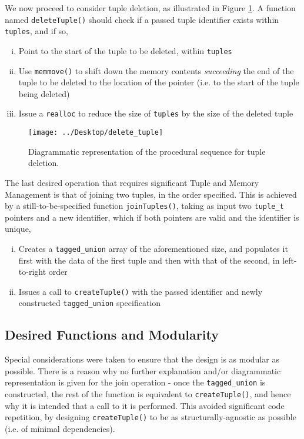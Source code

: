 \documentclass[10pt, a4paper, oneside]{memoir}
\begin{document}
	We now proceed to consider tuple deletion, as illustrated in Figure \ref{fig:deletetuple}. A function named \texttt{deleteTuple()} should check if a passed tuple identifier exists within \texttt{tuples}, and if so,
	\begin{enumerate}[i.]
		\item Point to the start of the tuple to be deleted, within \texttt{tuples}
		\item Use \texttt{memmove()} to shift down the memory contents \textit{succeeding} the end of the tuple to be deleted to the location of the pointer (i.e. to the start of the tuple being deleted)
		\item Issue a \texttt{realloc} to reduce the size of \texttt{tuples} by the size of the deleted tuple
	\end{enumerate}

	\begin{figure}[h]
		\centering
		\texttt{[image: ../Desktop/delete\_tuple]}
		\caption{Diagrammatic representation of the procedural sequence for tuple deletion.}
		\label{fig:deletetuple}
	\end{figure}

	The last desired operation that requires significant Tuple and Memory Management is that of joining two tuples, in the order specified. This is achieved by a still-to-be-specified function \texttt{joinTuples()}, taking as input two \texttt{tuple_t} pointers and a new identifier, which if both pointers are valid and the identifier is unique,
	\begin{enumerate}[i.]
		\item Creates a \texttt{tagged_union} array of the aforementioned size, and populates it first with the data of the first tuple and then with that of the second, in left-to-right order
		\item Issues a call to \texttt{createTuple()} with the passed identifier and newly constructed \texttt{tagged_union} specification
	\end{enumerate}

	\subsection{Desired Functions and Modularity}
	
	Special considerations were taken to ensure that the design is as modular as possible. There is a reason why no further explanation and/or diagrammatic representation is given for the join operation - once the \texttt{tagged_union} is constructed, the rest of the function is equivalent to \texttt{createTuple()}, and hence why it is intended that a call to it is performed. This avoided significant code repetition, by designing \texttt{createTuple()} to be as structurally-agnostic as possible (i.e. of minimal dependencies).\\
	
\end{document}
